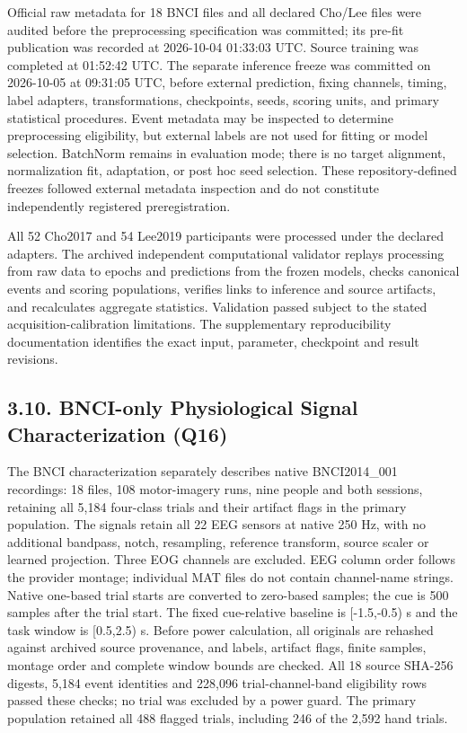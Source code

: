 \documentclass[11pt]{article}
\begin{document}
Official raw metadata for 18 BNCI files and all declared Cho/Lee files were audited before the preprocessing specification was committed; its pre-fit publication was recorded at 2026-10-04 01:33:03 UTC. Source training was completed at 01:52:42 UTC. The separate inference freeze was committed on 2026-10-05 at 09:31:05 UTC, before external prediction, fixing channels, timing, label adapters, transformations, checkpoints, seeds, scoring units, and primary statistical procedures. Event metadata may be inspected to determine preprocessing eligibility, but external labels are not used for fitting or model selection. BatchNorm remains in evaluation mode; there is no target alignment, normalization fit, adaptation, or post hoc seed selection. These repository-defined freezes followed external metadata inspection and do not constitute independently registered preregistration.

All 52 Cho2017 and 54 Lee2019 participants were processed under the declared adapters. The archived independent computational validator replays processing from raw data to epochs and predictions from the frozen models, checks canonical events and scoring populations, verifies links to inference and source artifacts, and recalculates aggregate statistics. Validation passed subject to the stated acquisition-calibration limitations. The supplementary reproducibility documentation identifies the exact input, parameter, checkpoint and result revisions.

\subsection*{3.10. BNCI-only Physiological Signal Characterization (Q16)}
The BNCI characterization separately describes native BNCI2014\_001 recordings: 18 files, 108 motor-imagery runs, nine people and both sessions, retaining all 5,184 four-class trials and their artifact flags in the primary population. The signals retain all 22 EEG sensors at native 250 Hz, with no additional bandpass, notch, resampling, reference transform, source scaler or learned projection. Three EOG channels are excluded. EEG column order follows the provider montage; individual MAT files do not contain channel-name strings. Native one-based trial starts are converted to zero-based samples; the cue is 500 samples after the trial start. The fixed cue-relative baseline is [-1.5,-0.5) s and the task window is [0.5,2.5) s. Before power calculation, all originals are rehashed against archived source provenance, and labels, artifact flags, finite samples, montage order and complete window bounds are checked. All 18 source SHA-256 digests, 5,184 event identities and 228,096 trial-channel-band eligibility rows passed these checks; no trial was excluded by a power guard. The primary population retained all 488 flagged trials, including 246 of the 2,592 hand trials.
\end{document}
